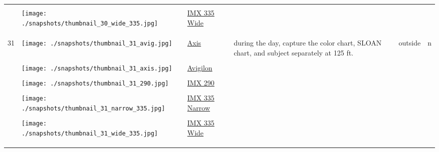 \documentclass{article}%
\begin{document}
\begin{longtabu}{m{2.5cm} m{4cm} m{2cm} m{4cm} m{2cm} m{2cm}}
&&&&&\\%
&\texttt{[image: ./snapshots/thumbnail\_30\_wide\_335.jpg]}&\href{https://drive.google.com/file/d/1XdX7RYpnXvogVshAxRZs-5iNttBfHa34/view?usp=sharing}{IMX 335 Wide}&&&\\%
&&&&&\\%
&&&&&\\%
\hline%
&&&&&\\%
31&\texttt{[image: ./snapshots/thumbnail\_31\_avig.jpg]}&\href{https://drive.google.com/file/d/11wpP6GZnaFhoZxMhRlveeqczbpdJFu-y/view?usp=sharing}{Axis}&during the day, capture the color chart, SLOAN chart, and subject separately at 125 ft.&outside&n\\%
&&&&&\\%
&\texttt{[image: ./snapshots/thumbnail\_31\_axis.jpg]}&\href{https://drive.google.com/file/d/1vZIsQQoGHKXcVQ4B47GvgKPeEuIh-DFQ/view?usp=sharing}{Avigilon}&&&\\%
&&&&&\\%
&\texttt{[image: ./snapshots/thumbnail\_31\_290.jpg]}&\href{https://drive.google.com/file/d/1hjCuwauieakQcjqrctZkJ0yVbIqzTMUW/view?usp=sharing}{IMX 290}&&&\\%
&&&&&\\%
&\texttt{[image: ./snapshots/thumbnail\_31\_narrow\_335.jpg]}&\href{https://drive.google.com/file/d/1kjleytUtVzIajM25TqLr_-HjFuzjMYd2/view?usp=sharing}{IMX 335 Narrow}&&&\\%
&&&&&\\%
&\texttt{[image: ./snapshots/thumbnail\_31\_wide\_335.jpg]}&\href{https://drive.google.com/file/d/1bJ31niHRfF_ljPbWkuIhYDJQLLWdZdgU/view?usp=sharing}{IMX 335 Wide}&&&\\%
&&&&&\\%
&&&&&\\%
\hline%
&&&&&\\%
\end{longtabu}%
\end{document}
